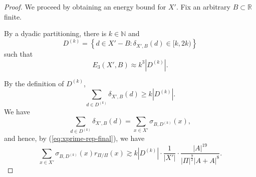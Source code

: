 \documentclass[10pt,a4paper]{amsart}
\begin{document}
\begin{proof}
We proceed by obtaining an energy bound for \(X'\).
Fix an arbitrary \(B \subset \mathbb{R} \) finite.

By a dyadic partitioning, there is \(k \in \mathbb{N} \) and
\[
    D^{(k)} = \left\{ d \in X'  - B  : \delta_{X',B} (d) \in [k,2k) \right\}
\]
such that
\[
    E_{3} (X',B)\approx k ^{3} \left\lvert D^{(k)} \right\rvert 
.\]

By the definition of \(D^{(k)}\),
\[
    \sum _{d \in D^{(k)}} \delta_{X',B} (d) \geq k \left\lvert D^{(k)} \right\rvert 
.\]
We have
\[
    \sum _{d \in D^{(k)}} \delta_{X',B} (d) = \sum _{x \in X'} \sigma_{B,D^{(k)}} (x)
,\]
and hence, by (\ref{eq:xprime-rep-final}), we have
\begin{equation} \label{eq:lem-lower-bound}
    \sum _{x \in X'} \sigma_{B,D^{(k)}} (x) r_{ \Pi / \Pi} (x) \gtrsim k \left\lvert D^{(k)} \right\rvert \cdot \frac{1}{\left\lvert X' \right\rvert } \cdot \frac{\left\lvert A \right\rvert ^{19}}{\left\lvert \Pi \right\rvert ^{\frac{9}{2} } \left\lvert A + A \right\rvert ^{8}}  .
\end{equation}  


\end{proof}
\end{document}
